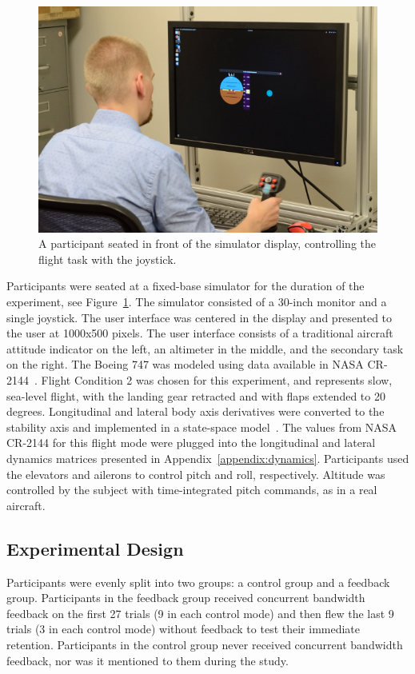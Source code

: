 \begin{figure}[b!]
    \begin{center}
        \includegraphics[width=0.8\linewidth]{figures/Aircraft/image2.png}
        \caption[A participant seated in front of the simulator display]{A participant seated in front of the simulator display, controlling the flight task with the joystick.}
        \label{figure-hfes:participant}
    \end{center}
\end{figure}

Participants were seated at a fixed-base simulator for the duration of the experiment, see Figure~\ref{figure-hfes:participant}.
The simulator consisted of a 30-inch monitor and a single joystick.
The user interface was centered in the display and presented to the user at 1000x500 pixels.
The user interface consists of a traditional aircraft attitude indicator on the left, an altimeter in the middle, and the secondary task on the right.
The Boeing 747 was modeled using data available in NASA CR-2144~\citep{heffley1972aircraft}.
Flight Condition 2 was chosen for this experiment, and represents slow, sea-level flight, with the landing gear retracted and with flaps extended to 20 degrees.
Longitudinal and lateral body axis derivatives were converted to the stability axis and implemented in a state-space model~\citep{stevens2015aircraft}.
The values from NASA CR-2144 for this flight mode were plugged into the longitudinal and lateral dynamics matrices presented in Appendix~\ref{appendix:dynamics}.
Participants used the elevators and ailerons to control pitch and roll, respectively.
Altitude was controlled by the subject with time-integrated pitch commands, as in a real aircraft.

\subsection{Experimental Design}
Participants were evenly split into two groups: a control group and a feedback group.
Participants in the feedback group received concurrent bandwidth feedback on the first 27 trials (9 in each control mode) and then flew the last 9 trials (3 in each control mode) without feedback to test their immediate retention.
Participants in the control group never received concurrent bandwidth feedback, nor was it mentioned to them during the study.

